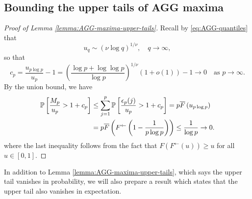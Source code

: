 \subsection{Bounding the upper tails of AGG maxima}
\label{subsec:bounding-upper-tails-of-maxima}


\begin{proof}[Proof of Lemma \ref{lemma:AGG-maxima-upper-tails}]
Recall by \eqref{eq:AGG-quantiles} that 
\begin{equation*}
    u_q\sim\left(\nu\log{q}\right)^{1/\nu}, \quad q\to\infty,
\end{equation*}
so that
\begin{equation} %
c_p  = \frac{u_{p\log{p}}}{u_p} -1 = \left(\frac{\log{p}+\log{\log{p}}}{\log{p}}\right)^{1/\nu}(1+o(1)) - 1 \rightarrow 0 \quad \mbox{as } p\to\infty.
\end{equation} 
By the union bound, we have
\begin{align}
    \P\left[\frac{M_p}{u_p} > 1+c_p\right] 
        &\le \sum_{j=1}^p \P\left[\frac{\epsilon_p(j)}{u_p} > 1+c_p\right] 
        = p \overline{F}\left(u_{p\log{p}}\right) \label{eq:AGG-maxima-upper-tails-proof-1} \\
        &= p \overline{F}\left(F^{\leftarrow}\left(1-\frac{1}{p\log{p}}\right)\right) \le \frac{1}{\log{p}} \rightarrow 0. \nonumber
\end{align}
where the last inequality follows from the fact that $F\left(F^{\leftarrow}(u)\right)\ge u$ for all $u\in[0,1]$.
\end{proof}

In addition to Lemma \ref{lemma:AGG-maxima-upper-tails}, which says the upper tail vanishes in probability, we will also prepare a result which states that the upper tail also vanishes in expectation.

